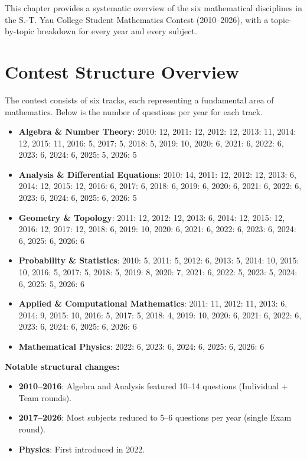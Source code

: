 
This chapter provides a systematic overview of the six mathematical disciplines in the S.-T. Yau College Student Mathematics Contest (2010--2026), with a topic-by-topic breakdown for every year and every subject.

\section{Contest Structure Overview}
\label{sec:overview}

The contest consists of six tracks, each representing a fundamental area of mathematics. Below is the number of questions per year for each track.

\begin{itemize}
    \item \textbf{Algebra \& Number Theory}: 2010: 12, 2011: 12, 2012: 12, 2013: 11, 2014: 12, 2015: 11, 2016: 5, 2017: 5, 2018: 5, 2019: 10, 2020: 6, 2021: 6, 2022: 6, 2023: 6, 2024: 6, 2025: 5, 2026: 5
    \item \textbf{Analysis \& Differential Equations}: 2010: 14, 2011: 12, 2012: 12, 2013: 6, 2014: 12, 2015: 12, 2016: 6, 2017: 6, 2018: 6, 2019: 6, 2020: 6, 2021: 6, 2022: 6, 2023: 6, 2024: 6, 2025: 6, 2026: 5
    \item \textbf{Geometry \& Topology}: 2011: 12, 2012: 12, 2013: 6, 2014: 12, 2015: 12, 2016: 12, 2017: 12, 2018: 6, 2019: 10, 2020: 6, 2021: 6, 2022: 6, 2023: 6, 2024: 6, 2025: 6, 2026: 6
    \item \textbf{Probability \& Statistics}: 2010: 5, 2011: 5, 2012: 6, 2013: 5, 2014: 10, 2015: 10, 2016: 5, 2017: 5, 2018: 5, 2019: 8, 2020: 7, 2021: 6, 2022: 5, 2023: 5, 2024: 6, 2025: 5, 2026: 6
    \item \textbf{Applied \& Computational Mathematics}: 2011: 11, 2012: 11, 2013: 6, 2014: 9, 2015: 10, 2016: 5, 2017: 5, 2018: 4, 2019: 10, 2020: 6, 2021: 6, 2022: 6, 2023: 6, 2024: 6, 2025: 6, 2026: 6
    \item \textbf{Mathematical Physics}: 2022: 6, 2023: 6, 2024: 6, 2025: 6, 2026: 6
\end{itemize}

\medskip
\textbf{Notable structural changes:}
\begin{itemize}
    \item \textbf{2010--2016}: Algebra and Analysis featured 10--14 questions (Individual + Team rounds).
    \item \textbf{2017--2026}: Most subjects reduced to 5--6 questions per year (single Exam round).
    \item \textbf{Physics}: First introduced in 2022.
\end{itemize}

